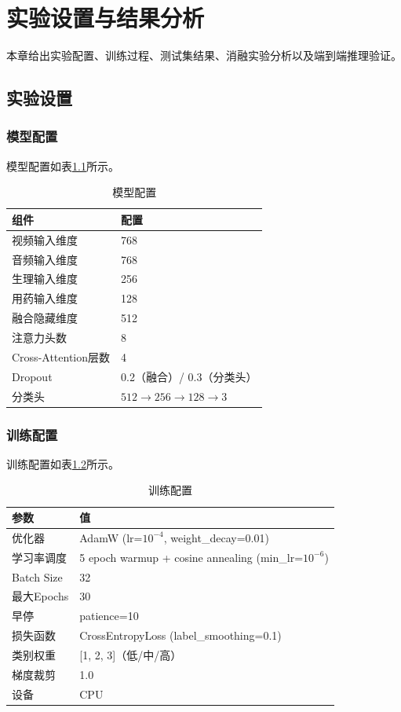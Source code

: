 \chapter{实验设置与结果分析}
\label{chap:exp}

本章给出实验配置、训练过程、测试集结果、消融实验分析以及端到端推理验证。

\section{实验设置}

\subsection{模型配置}

模型配置如表\ref{tab:model_config}所示。

\begin{table}[H]
\centering
\caption{模型配置}
\label{tab:model_config}
\begin{tabular}{ll}
\toprule
组件 & 配置 \\
\midrule
视频输入维度 & 768 \\
音频输入维度 & 768 \\
生理输入维度 & 256 \\
用药输入维度 & 128 \\
融合隐藏维度 & 512 \\
注意力头数 & 8 \\
Cross-Attention层数 & 4 \\
Dropout & 0.2（融合）/ 0.3（分类头） \\
分类头 & $512 \to 256 \to 128 \to 3$ \\
\bottomrule
\end{tabular}
\end{table}

\subsection{训练配置}

训练配置如表\ref{tab:train_config}所示。

\begin{table}[H]
\centering
\caption{训练配置}
\label{tab:train_config}
\begin{tabular}{ll}
\toprule
参数 & 值 \\
\midrule
优化器 & AdamW (lr=$10^{-4}$, weight\_decay=0.01) \\
学习率调度 & 5 epoch warmup + cosine annealing (min\_lr=$10^{-6}$) \\
Batch Size & 32 \\
最大Epochs & 30 \\
早停 & patience=10 \\
损失函数 & CrossEntropyLoss (label\_smoothing=0.1) \\
类别权重 & [1, 2, 3]（低/中/高） \\
梯度裁剪 & 1.0 \\
设备 & CPU \\
\bottomrule
\end{tabular}
\end{table}

